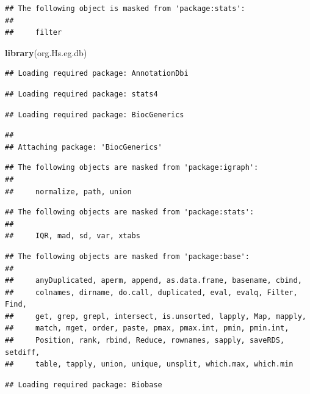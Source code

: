 \documentclass[
]{article}
\newenvironment{Shaded}{\begin{snugshade}}{\end{snugshade}}
\newcommand{\FunctionTok}[1]{\textcolor[rgb]{0.13,0.29,0.53}{\textbf{#1}}}
\newcommand{\NormalTok}[1]{#1}
\begin{document}
\begin{verbatim}
## The following object is masked from 'package:stats':
## 
##     filter
\end{verbatim}

\begin{Shaded}
\begin{Highlighting}[]
\FunctionTok{library}\NormalTok{(org.Hs.eg.db)}
\end{Highlighting}
\end{Shaded}

\begin{verbatim}
## Loading required package: AnnotationDbi
\end{verbatim}

\begin{verbatim}
## Loading required package: stats4
\end{verbatim}

\begin{verbatim}
## Loading required package: BiocGenerics
\end{verbatim}

\begin{verbatim}
## 
## Attaching package: 'BiocGenerics'
\end{verbatim}

\begin{verbatim}
## The following objects are masked from 'package:igraph':
## 
##     normalize, path, union
\end{verbatim}

\begin{verbatim}
## The following objects are masked from 'package:stats':
## 
##     IQR, mad, sd, var, xtabs
\end{verbatim}

\begin{verbatim}
## The following objects are masked from 'package:base':
## 
##     anyDuplicated, aperm, append, as.data.frame, basename, cbind,
##     colnames, dirname, do.call, duplicated, eval, evalq, Filter, Find,
##     get, grep, grepl, intersect, is.unsorted, lapply, Map, mapply,
##     match, mget, order, paste, pmax, pmax.int, pmin, pmin.int,
##     Position, rank, rbind, Reduce, rownames, sapply, saveRDS, setdiff,
##     table, tapply, union, unique, unsplit, which.max, which.min
\end{verbatim}

\begin{verbatim}
## Loading required package: Biobase
\end{verbatim}
\end{document}
